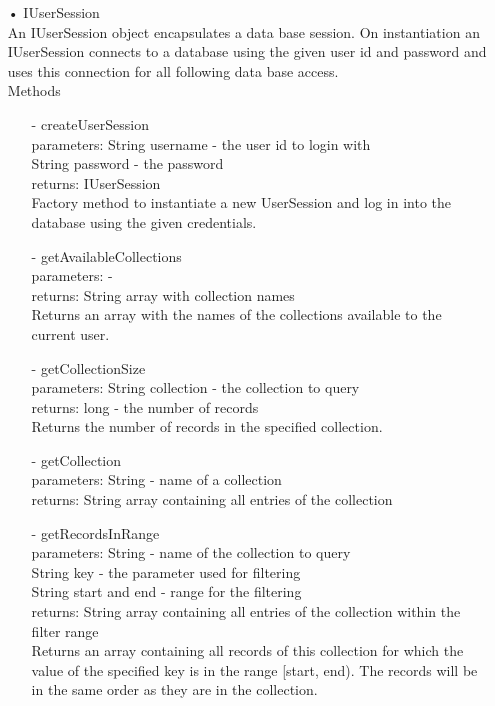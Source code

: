 \documentclass[oneside, english, final]{design}
\begin{document}
\begin{itemize}
	\newpage
	\item[•]IUserSession
	      \\An IUserSession object encapsulates a data base session.
	      On instantiation an IUserSession connects to a database using
	      the given user id and password and uses this connection for
	      all following data base access.
	      \\Methods
	      \begin{itemize}
		      \item[-]createUserSession
		            \\parameters: String username - the user id to login with
		            \\String password - the password
		            \\returns: IUserSession
		            \\Factory method to instantiate a new UserSession and log in into the database using the given credentials.

		      \item[-]getAvailableCollections
		            \\parameters: -
		            \\returns: String array with collection names
		            \\Returns an array with the names of the collections available to the current user.

		      \item[-]getCollectionSize
		            \\parameters: String collection - the collection to query
		            \\returns: long - the number of records
		            \\Returns the number of records in the specified collection.

		      \item[-]getCollection
		            \\parameters: String - name of a collection
		            \\returns: String array containing all entries of the collection

		      \item[-]getRecordsInRange
		            \\parameters: String - name of the collection to query
		            \\String key - the parameter used for filtering
		            \\String start and end - range for the filtering
		            \\returns: String array containing all entries of the collection within the filter range
		            \\ Returns an array containing all records of this
		            collection for which the value of the
		            specified key is in the range [start, end).
		            The records will be in the same order as
		            they are in the collection.


\end{itemize}
\end{itemize}
\end{document}
